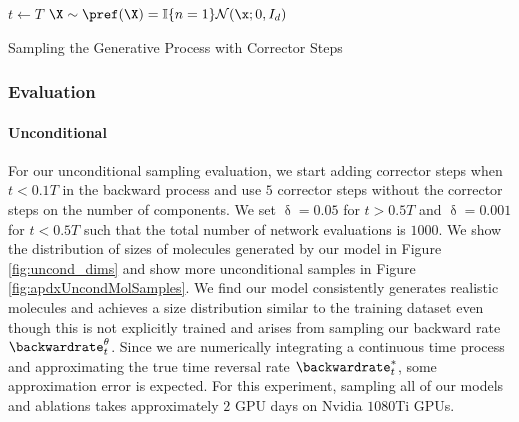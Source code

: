 \begin{algorithm}[]
    \SetAlgoNoLine
    \DontPrintSemicolon
    $t \leftarrow T$\;
    $\X \sim \pref(\X) = \mathbb{I}\{ n=1\} \mathcal{N}(\x; 0, I_{d})$\;
     \caption{Sampling the Generative Process with Corrector Steps}
     \label{alg:backwardsamplingWithCorrector}
\end{algorithm}

\subsubsection{Evaluation}
\paragraph{Unconditional}
For our unconditional sampling evaluation, we start adding corrector steps when $t<0.1T$ in the backward process and use $5$ corrector steps without the corrector steps on the number of components. We set $\updelta = 0.05$ for $ t > 0.5T$ and $\updelta = 0.001$ for $t<0.5T$ such that the total number of network evaluations is $1000$. We show the distribution of sizes of molecules generated by our model in Figure \ref{fig:uncond_dims} and show more unconditional samples in Figure \ref{fig:apdxUncondMolSamples}. We find our model consistently generates realistic molecules and achieves a size distribution similar to the training dataset even though this is not explicitly trained and arises from sampling our backward rate $\backwardrate_t^\theta$. Since we are numerically integrating a continuous time process and approximating the true time reversal rate $\backwardrate_t^*$, some approximation error is expected. For this experiment, sampling all of our models and ablations takes approximately $2$ GPU days on Nvidia $1080$Ti GPUs.

